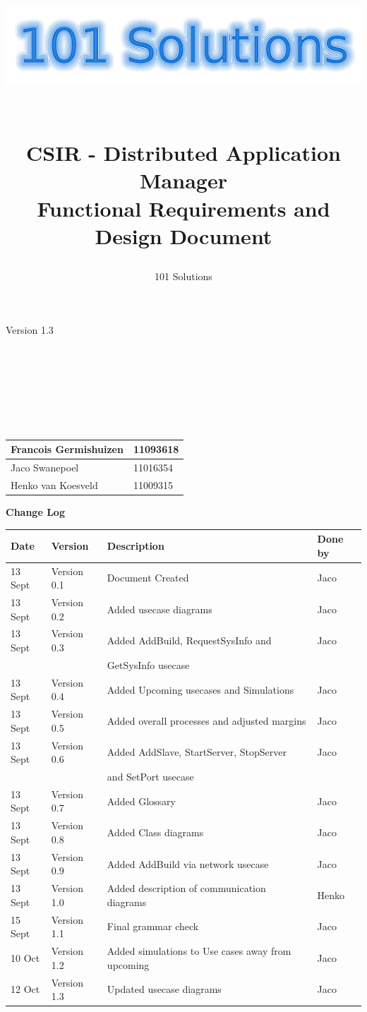 \documentclass[a4paper,12pt,final]{article}
\title{
\begin{center}
  	\includegraphics[scale=0.3]{101Logo.png} 
  \end{center}
  \textbf{\\}
CSIR - Distributed Application Manager\\
Functional Requirements and Design Document\\
}
\author{101 Solutions}
\begin{document}
\maketitle
\begin{center}
Version 1.3
\end{center}
\textbf{\\}
\textbf{\\}
\textbf{\\}
\textbf{\\}
\textbf{\\}
\textbf{\\}
\begin{center}
\begin{tabular}{|l|l|}
\hline
Francois Germishuizen & 11093618\\
\hline
Jaco Swanepoel & 11016354\\
\hline
Henko van Koesveld & 11009315\\
\hline
\end{tabular}
\end{center}
\thispagestyle{empty}
\newpage
\thispagestyle{empty}
\textbf{\large{Change Log}}
\vspace{6pt}\newline
\begin{tabular}{|l|l|l|l|}
\hline
\textbf{Date} & \textbf{Version} & \textbf{Description} & \textbf{Done by}\\
\hline
13 Sept & Version 0.1 & Document Created & Jaco\\
\hline
13 Sept & Version 0.2 & Added usecase diagrams & Jaco\\
\hline
13 Sept & Version 0.3 & Added AddBuild, RequestSysInfo and  & Jaco\\
&&GetSysInfo usecase&\\
\hline
13 Sept & Version 0.4 & Added Upcoming usecases and Simulations & Jaco\\
\hline
13 Sept & Version 0.5 & Added overall processes and adjusted margins & Jaco\\
\hline
13 Sept & Version 0.6 & Added AddSlave, StartServer, StopServer  & Jaco\\
&&and SetPort usecase&\\
\hline
13 Sept & Version 0.7 & Added Glossary & Jaco\\
\hline
13 Sept & Version 0.8 & Added Class diagrams & Jaco\\
\hline
13 Sept & Version 0.9 & Added AddBuild via network usecase & Jaco\\
\hline
13 Sept & Version 1.0 & Added description of communication diagrams & Henko\\
\hline
15 Sept & Version 1.1 & Final grammar check & Jaco\\
\hline
10 Oct & Version 1.2 & Added simulations to Use cases away from upcoming & Jaco\\
\hline
12 Oct & Version 1.3 & Updated usecase diagrams & Jaco\\
\hline
\end{tabular}
\newpage
\tableofcontents
\thispagestyle{empty}
\newpage
\end{document}
